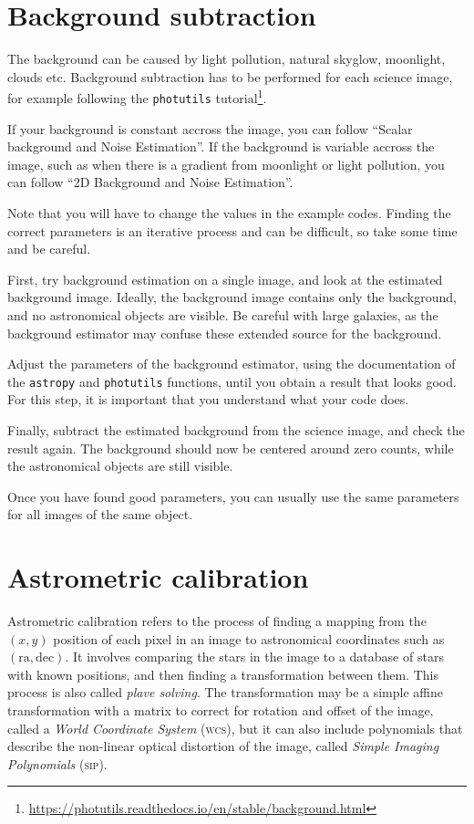 \documentclass[a4paper, 11pt, fleqn]{memoir}
\begin{document}
\section{Background subtraction}
\label{ssec:background-subtraction}

The background can be caused by light pollution, natural skyglow, moonlight, clouds etc.
Background subtraction has to be performed for each science image, for example following the \texttt{photutils} tutorial\footnote{\url{https://photutils.readthedocs.io/en/stable/background.html}}.

If your background is constant accross the image, you can follow \enquote{Scalar background and Noise Estimation}.
If the background is variable accross the image, such as when there is a gradient from moonlight or light pollution, you can follow \enquote{2D Background and Noise Estimation}.

Note that you will have to change the values in the example codes.
Finding the correct parameters is an iterative process and can be difficult, so take some time and be careful.

First, try background estimation on a single image, and look at the estimated background image.
Ideally, the background image contains only the background, and no astronomical objects are visible.
Be careful with large galaxies, as the background estimator may confuse these extended source for the background.

Adjust the parameters of the background estimator, using the documentation of the \texttt{astropy} and \texttt{photutils} functions, until you obtain a result that looks good.
For this step, it is important that you understand what your code does.

Finally, subtract the estimated background from the science image, and check the result again.
The background should now be centered around zero counts, while the astronomical objects are still visible.

Once you have found good parameters, you can usually use the same parameters for all images of the same object.

\section{Astrometric calibration}
\label{ssec:astrometric-calibration}

Astrometric calibration refers to the process of finding a mapping from the $(x,y)$ position of each pixel in an image to astronomical coordinates such as $(\text{ra}, \text{dec})$.
It involves comparing the stars in the image to a database of stars with known positions, and then finding a transformation between them.
This process is also called \emph{plave solving}.
The transformation may be a simple affine transformation with a matrix to correct for rotation and offset of the image, called a \emph{World Coordinate System} (\textsc{wcs}), but it can also include polynomials that describe the non-linear optical distortion of the image, called \emph{Simple Imaging Polynomials} (\textsc{sip}).
\end{document}
